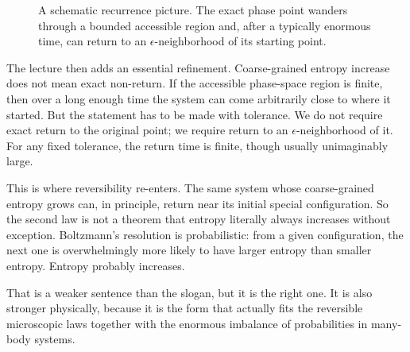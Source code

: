 \begin{figure}[h]
\centering
{}
\caption{A schematic recurrence picture. The exact phase point wanders through a bounded accessible region and, after a typically enormous time, can return to an \(\epsilon\)-neighborhood of its starting point.}
\end{figure}

The lecture then adds an essential refinement. Coarse-grained entropy increase does not mean exact non-return. If the accessible phase-space region is finite, then over a long enough time the system can come arbitrarily close to where it started. But the statement has to be made with tolerance. We do not require exact return to the original point; we require return to an \(\epsilon\)-neighborhood of it. For any fixed tolerance, the return time is finite, though usually unimaginably large.

This is where reversibility re-enters. The same system whose coarse-grained entropy grows can, in principle, return near its initial special configuration. So the second law is not a theorem that entropy literally always increases without exception. Boltzmann's resolution is probabilistic: from a given configuration, the next one is overwhelmingly more likely to have larger entropy than smaller entropy. Entropy probably increases.

That is a weaker sentence than the slogan, but it is the right one. It is also stronger physically, because it is the form that actually fits the reversible microscopic laws together with the enormous imbalance of probabilities in many-body systems.

